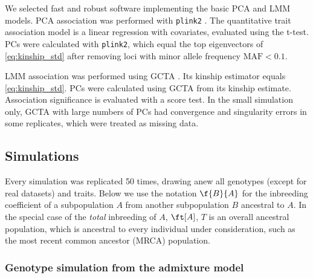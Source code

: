 \documentclass[11pt]{article}
\begin{document}
\begin{linenumbers}
We selected fast and robust software implementing the basic PCA and LMM models.
PCA association was performed with \texttt{plink2} \citep{chang_second-generation_2015}.
The quantitative trait association model is a linear regression with covariates, evaluated using the t-test.
PCs were calculated with \texttt{plink2}, which equal the top eigenvectors of \cref{eq:kinship_std} after removing loci with minor allele frequency $\text{MAF} < 0.1$.

LMM association was performed using GCTA \citep{yang_gcta:_2011,yang_advantages_2014}.
Its kinship estimator equals \cref{eq:kinship_std}.
PCs were calculated using GCTA from its kinship estimate.
Association significance is evaluated with a score test.
In the small simulation only, GCTA with large numbers of PCs had convergence and singularity errors in some replicates, which were treated as missing data.

\subsection{Simulations}

Every simulation was replicated 50 times, drawing anew all genotypes (except for real datasets) and traits.
Below we use the notation $\f{B}{A}$ for the inbreeding coefficient of a subpopulation $A$ from another subpopulation $B$ ancestral to $A$.
In the special case of the \textit{total} inbreeding of $A$, $\ft[A]$, $T$ is an overall ancestral population, which is ancestral to every individual under consideration, such as the most recent common ancestor (MRCA) population.

\subsubsection{Genotype simulation from the admixture model}


\end{linenumbers}
\end{document}
